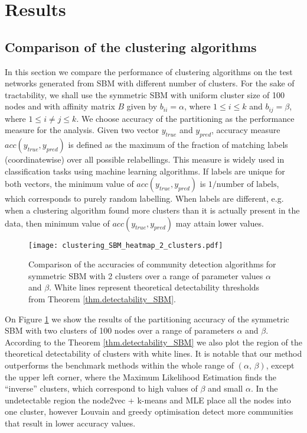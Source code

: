 \section{Results}
\subsection{Comparison of the clustering algorithms}
In this section we compare the performance of clustering algorithms on the test networks generated from SBM with different number of clusters. For the sake of tractability, we shall use the symmetric SBM with uniform cluster size of 100 nodes and with affinity matrix $B$ given by $b_{ii}=\alpha$, where $1\leq i\leq k$ and $b_{ij} = \beta$, where $1\leq i\neq j\leq k$. We choose accuracy of the partitioning as the performance measure for the analysis. Given two vector $y_{true}$ and $y_{pred}$, accuracy measure $acc(y_{true}, y_{pred})$ is defined as the maximum of the fraction of matching labels (coordinatewise) over all possible relabellings. This measure is widely used in classification tasks using machine learning algorithms. If labels are unique for both vectors, the minimum value of $acc(y_{true}, y_{pred})$ is $1/\text{number of labels}$, which corresponds to purely random labelling. When labels are different, e.g. when a clustering algorithm found more clusters than it is  actually present in the data, then minimum value of $acc(y_{true}, y_{pred})$ may attain lower values. 
\begin{figure}[ht]
 \centering
    \texttt{[image: clustering\_SBM\_heatmap\_2\_clusters.pdf]}
   \caption{Comparison of the accuracies of community detection algorithms for symmetric SBM with 2 clusters over a range of parameter values $\alpha$ and $\beta$. White lines represent theoretical detectability thresholds from Theorem \ref{thm.detectability_SBM}.}
   \label{fig:comparison_clustering_2clusters}
 \end{figure}
 
On Figure \ref{fig:comparison_clustering_2clusters} we show the results of the partitioning accuracy of the symmetric SBM with two clusters of 100 nodes over a range of parameters $\alpha$ and $\beta$. According to the Theorem \ref{thm.detectability_SBM} we also plot the region of the theoretical detectability of clusters with white lines. It is notable that our method outperforms the benchmark methods within the whole range of $(\alpha,\,\beta)$, except the upper left corner, where the Maximum Likelihood Estimation finds the ``inverse'' clusters, which correspond to high values of $\beta$ and small $\alpha$. In the undetectable region the node2vec + k-means and MLE place all the nodes into one cluster, however Louvain and greedy optimisation detect more communities that result in lower accuracy values.

